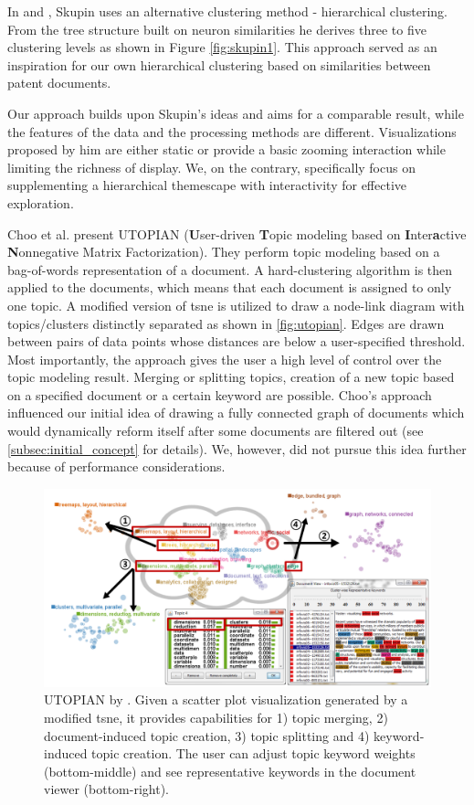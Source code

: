 In \cite{Skupin2002} and \cite{Skupin2004a}, Skupin uses an alternative clustering method - hierarchical clustering.
From the tree structure built on neuron similarities he derives three to five clustering levels as shown in Figure \autoref{fig:skupin1}.
This approach served as an inspiration for our own hierarchical clustering based on similarities between patent documents.

Our approach builds upon Skupin's ideas and aims for a comparable result, while the features of the data and the processing methods are different.
Visualizations proposed by him are either static or provide a basic zooming interaction while limiting the richness of display.
We, on the contrary, specifically focus on supplementing a hierarchical themescape with interactivity for effective exploration.

Choo et al. \cite{utopian} present UTOPIAN (\textbf{U}ser-driven \textbf{T}opic modeling based on \textbf{I}nter\textbf{a}ctive \textbf{N}onnegative Matrix Factorization).
They perform topic modeling based on a bag-of-words representation of a document.
A hard-clustering algorithm is then applied to the documents, which means that each document is assigned to only one topic.
A modified version of \gls{tsne} is utilized to draw a node-link diagram with topics/clusters distinctly separated as shown in \autoref{fig:utopian}.
Edges are drawn between pairs of data points whose distances are below a user-specified threshold.
Most importantly, the approach gives the user a high level of control over the topic modeling result.
Merging or splitting topics, creation of a new topic based on a specified document or a certain keyword are possible.
Choo's approach influenced our initial idea of drawing a fully connected graph of documents which would dynamically reform itself after some documents are filtered out (see \autoref{subsec:initial_concept} for details).
We, however, did not pursue this idea further because of performance considerations.

\begin{figure}[!]
\centering
\includegraphics[width=\textwidth]{img/utopian}
\caption{UTOPIAN by \cite{utopian}. Given a scatter plot visualization generated by a modified \gls{tsne}, it provides capabilities for 1) topic merging, 2) document-induced topic creation, 3) topic splitting and 4) keyword-induced topic creation. The user can adjust topic keyword weights (bottom-middle) and see representative keywords in the document viewer (bottom-right).}
\label{fig:utopian}
\end{figure}

